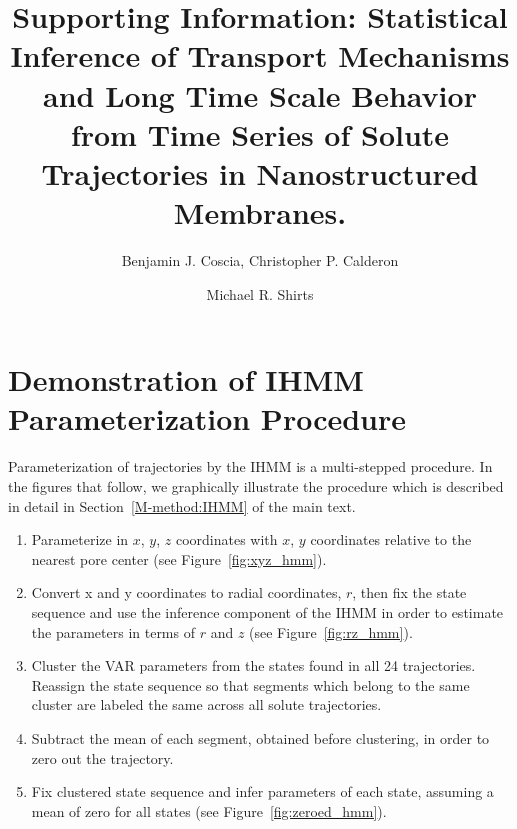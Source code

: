 \documentclass{article}
\title{Supporting Information: Statistical Inference of Transport Mechanisms and Long Time Scale Behavior from Time Series 
       of Solute Trajectories in Nanostructured Membranes.}
\author{Benjamin J. Coscia, Christopher P. Calderon \and Michael R. Shirts}
\begin{document}
  \graphicspath{{./supporting_figures/}}
  \maketitle
  
  \section{Demonstration of IHMM Parameterization Procedure}\label{section:ihmm_procedure}
  
  Parameterization of trajectories by the IHMM is a multi-stepped procedure. In the figures
  that follow, we graphically illustrate the procedure which is described in detail in
  Section~\ref{M-method:IHMM} of the main text.
  
  \begin{enumerate}
  	\item Parameterize in $x$, $y$, $z$ coordinates with $x$, $y$ coordinates relative to the nearest
  	pore center (see Figure~\ref{fig:xyz_hmm}). 	
  	\item Convert x and y coordinates to radial coordinates, $r$, then fix the state sequence
  	and use the inference component of the IHMM in order to estimate the parameters in terms
  	of $r$ and $z$ (see Figure~\ref{fig:rz_hmm}). 	 	
  	\item Cluster the VAR parameters from the states found in all 24 trajectories. Reassign the state
  	sequence so that segments which belong to the same cluster are labeled the same across all solute
  	trajectories.
  	\item Subtract the mean of each segment, obtained before clustering, in order to zero out the
  	trajectory.
  	\item Fix clustered state sequence and infer parameters of each state, assuming a mean of zero
  	for all states (see Figure~\ref{fig:zeroed_hmm}). 
  \end{enumerate}
  
\end{document}
